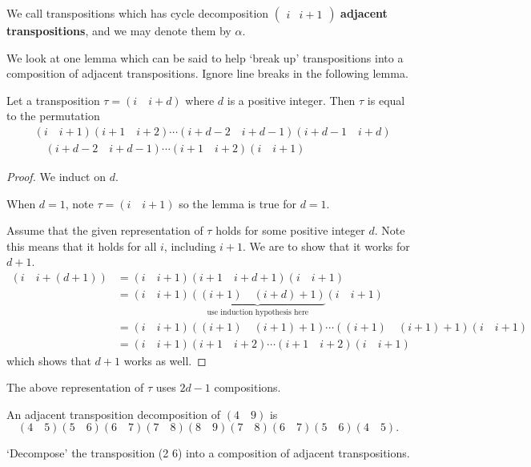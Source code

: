 We call transpositions which has cycle decomposition $\begin{pmatrix}i&i+1\end{pmatrix}$ \textbf{adjacent transpositions}, and we may denote them by $\alpha$.

We look at one lemma which can be said to help `break up' transpositions into a composition of adjacent transpositions. Ignore line breaks in the following lemma.
\begin{lemma}\label{lemma-decompose-transposition}
    Let a transposition $\tau = (i\quad i+d)$ where $d$ is a positive integer. Then $\tau$ is equal to the permutation
    \begin{align*}
        & (i\quad i+1)(i+1\quad i+2)\cdots(i+d-2\quad i+d-1)(i+d-1\quad i+d)\\
        &\quad (i+d-2\quad i+d-1)\cdots(i+1\quad i+2)(i\quad i+1)
    \end{align*}
\end{lemma}

\begin{proof}
    We induct on $d$.

    When $d = 1$, note $\tau = (i\quad i+1)$ so the lemma is true for $d=1$.

    Assume that the given representation of $\tau$ holds for some positive integer $d$. Note this means that it holds for all $i$, including $i+1$. We are to show that it works for $d + 1$.
    \begin{align*}
        (i\quad i+(d+1)) &= (i\quad i+1)(i+1\quad i+d+1)(i\quad i+1)\\
        &= (i\quad i+1)\underbrace{((i+1)\quad (i+d)+1)}_{\text{use induction hypothesis here}}(i\quad i+1)\\
        &= (i\quad i+1)((i+1)\quad(i+1)+1)\cdots((i+1)\quad(i+1)+1)(i\quad i+1)\\
        &= (i\quad i+1)(i+1\quad i+2)\cdots(i+1\quad i+2)(i\quad i+1)
    \end{align*}
    which shows that $d+1$ works as well.
\end{proof}
\begin{remark}
    The above representation of $\tau$ uses $2d-1$ compositions.
\end{remark}
\begin{example}
    An adjacent transposition decomposition of $(4\quad9)$ is
    \[
        (4\quad 5)(5\quad 6)(6\quad 7)(7\quad 8)(8\quad 9)(7\quad 8)(6\quad 7)(5\quad 6)(4\quad 5).
    \]
\end{example}
\begin{exercise}
    `Decompose' the transposition (2 6) into a composition of adjacent transpositions.
\end{exercise}

